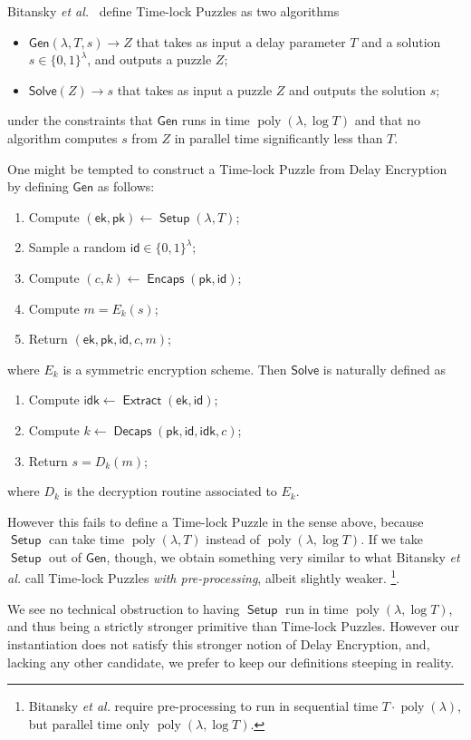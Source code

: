 \documentclass{llncs}
\DeclareMathOperator{\poly}{poly}
\DeclareMathOperator{\Setup}{\mathsf{Setup}}
\DeclareMathOperator{\Extract}{\mathsf{Extract}}
\DeclareMathOperator{\Encaps}{\mathsf{Encaps}}
\DeclareMathOperator{\Decaps}{\mathsf{Decaps}}
\newcommand{\ek}{\mathsf{ek}}
\newcommand{\pk}{\mathsf{pk}}
\newcommand{\id}{\mathsf{id}}
\newcommand{\idk}{\mathsf{idk}}
\begin{document}
Bitansky \emph{et al.}~\cite{10.1145/2840728.2840745} define 
Time-lock Puzzles as two algorithms
\begin{itemize}
\item $\mathsf{Gen}(\lambda,T, s) \to Z$ that takes as input a delay parameter
  $T$ and a solution $s\in\{0,1\}^\lambda$, and outputs a puzzle $Z$;
\item $\mathsf{Solve}(Z) \to s$ that takes as input a puzzle $Z$ and
  outputs the solution $s$;
\end{itemize}
under the constraints that $\mathsf{Gen}$ runs in time
$\poly(\lambda,\log T)$ and that no algorithm computes $s$ from $Z$ in
parallel time significantly less than $T$.

One might be tempted to construct a Time-lock Puzzle from Delay
Encryption by defining $\mathsf{Gen}$ as follows:
\begin{enumerate}
\item Compute $(\ek,\pk) \gets \Setup(\lambda,T)$;
\item Sample a random $\id\in\{0,1\}^\lambda$;
\item Compute $(c,k) \gets \Encaps(\pk, \id)$;
\item Compute $m = E_k(s)$;
\item Return $(\ek,\pk,\id,c,m)$;
\end{enumerate}
where $E_k$ is a symmetric encryption scheme. %
Then $\mathsf{Solve}$ is naturally defined as
\begin{enumerate}
\item Compute $\idk \gets \Extract(\ek,\id)$;
\item Compute $k \gets \Decaps(\pk,\id,\idk,c)$;
\item Return $s = D_k(m)$;
\end{enumerate}
where $D_k$ is the decryption routine associated to $E_k$. %

However this fails to define a Time-lock Puzzle in the sense above,
because $\Setup$ can take time $\poly(\lambda,T)$ instead of
$\poly(\lambda,\log T)$. %
If we take $\Setup$ out of $\mathsf{Gen}$, though, we obtain something
very similar to what Bitansky \emph{et al.} call Time-lock Puzzles
\emph{with pre-processing}, albeit slightly weaker.%
\footnote{Bitansky \emph{et al.} require pre-processing to run in
  sequential time $T\cdot\poly(\lambda)$, but parallel time only
  $\poly(\lambda,\log T)$.}.

We see no technical obstruction to having $\Setup$ run in time
$\poly(\lambda,\log T)$, and thus being a strictly stronger primitive
than Time-lock Puzzles. %
However our instantiation does not satisfy this stronger notion of
Delay Encryption, and, lacking any other candidate, we prefer to keep
our definitions steeping in reality.
\end{document}

